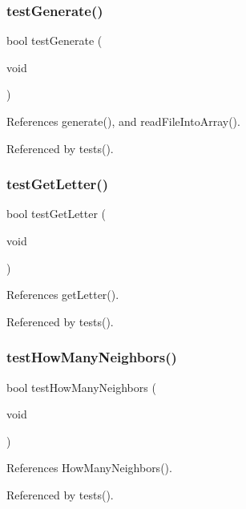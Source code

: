 \subsubsection{test\+Generate()}
{\footnotesize\ttfamily bool test\+Generate (\begin{DoxyParamCaption}\item[{void}]{ }\end{DoxyParamCaption})}



References generate(), and read\+File\+Into\+Array().



Referenced by tests().

\mbox{\label{tests_8h_a9b70c29f84da569aff4c79611734cae7}} 
\subsubsection{test\+Get\+Letter()}
{\footnotesize\ttfamily bool test\+Get\+Letter (\begin{DoxyParamCaption}\item[{void}]{ }\end{DoxyParamCaption})}



References get\+Letter().



Referenced by tests().

\mbox{\label{tests_8h_a61a9bf4e92f96b3669a4eb9c2af3eca9}} 
\subsubsection{test\+How\+Many\+Neighbors()}
{\footnotesize\ttfamily bool test\+How\+Many\+Neighbors (\begin{DoxyParamCaption}\item[{void}]{ }\end{DoxyParamCaption})}



References How\+Many\+Neighbors().



Referenced by tests().

\mbox{\label{tests_8h_af6e338851f3ccb4714e1bfb06ec4b428}} 
